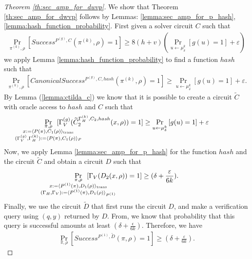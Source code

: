 \begin{proof}[Theorem \ref{th:sec_amp_for_dwvp}]
We show that Theorem \ref{th:sec_amp_for_dwvp} follows by Lemmas: \ref{lemma:sec_amp_for_p_hash}, \ref{lemma:hash_function_probability}.
First given a solver circuit $C$ such that
\begin{align*}
    \underset{\pi^{(k)}, \rho}{\Pr}\left[Success^{P^{(g)}, C}(\pi^{(k)}, \rho) = 1\right] \geq 8(h+v)\left(\underset{u \leftarrow \mu_\delta^k}{\Pr}\left[g(u) = 1\right] + \varepsilon\right)
\end{align*}
we apply Lemma \ref{lemma:hash_function_probability} to find a function $hash$ such that
\begin{align*}
    \underset{\pi^{(k)}, \rho}{\Pr}\left[CanonicalSuccess^{P^{(g)}, C, hash}(\pi^{(k)}, \rho) = 1\right] \geq \underset{u \leftarrow \mu_\delta^k}{\Pr}\left[g(u) = 1\right] + \varepsilon.
\end{align*}
By Lemma (\ref{lemma:ctilda_c}) we know that it is possible to create a circuit $\widetilde{C}$ with oracle access to $hash$ and $C$ such that
\begin{align*}
    \underset{
      \mathclap {
      \substack{\pi, \rho \\
        x := \langle P(\pi), C_1(\rho) \rangle_{\text{trans}} \\
        (\Gamma_V^{(g)}, \Gamma_H^{(k)}) := \langle P(\pi), C_1(\rho) \rangle_{P}
      }}}
    {\Pr}\mkern13mu[\Gamma_V^{(g)}(\widetilde{C}_2^{\Gamma_H^{(k)}, C_2, hash}(x, \rho)) = 1]
    \geq
\underset{u \leftarrow \mu_\delta^k}{\Pr}\left[g(u) = 1\right] + \varepsilon
\end{align*}
Now, we apply Lemma \ref{lemma:sec_amp_for_p_hash} for the function $hash$ and the circuit $\widetilde{C}$ and obtain a circuit $D$ such that
\begin{align}
  \label{eq:succ_prob_d}
    \underset{
      \mathclap{
      \substack{\pi, \rho \\ x := \langle P^{(1)}(\pi), D_1(\rho) \rangle_{\text{trans}} \\
        (\Gamma_H, \Gamma_V) := \langle P^{(1)}(\pi), D_1(\rho) \rangle_{P^{(1)}}}}}
    {\Pr}\mkern13mu[\Gamma_V(D_2(x, \rho)) = 1] \geq (\delta + \frac{\varepsilon}{6k}).
\end{align}
Finally, we use the circuit $\widetilde{D}$ that first runs the circuit $D$, and make a verification
query using $(q,y)$ returned by $D$. From, we know that probability that this query is successful amounts at least $(\delta + \frac{\epsilon}{6k})$.
Therefore, we have
\begin{align*}
    \underset{\pi, \rho}{\Pr}\left[Success^{P^{(1)},\widetilde{D}}(\pi, \rho) = 1\right] \geq (\delta + \frac{\varepsilon}{6k}).
\end{align*}
\end{proof}

